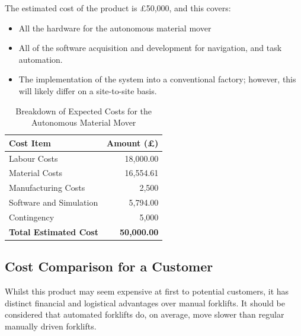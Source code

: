 \documentclass[12pt,titlepage]{article}
\begin{document}
\begin{table}[H]
    \centering
    \begin{minipage}[t]{0.5\textwidth}
        \setlength{\parskip}{0pt} %
        \vspace{-10pt}
        The estimated cost of the product is £50,000, and this covers:
        \vspace{-10pt}
        \begin{itemize}
        \setlength{\itemsep}{0pt}
            \item All the hardware for the autonomous material mover
            \item All of the software acquisition and development for navigation, and task automation.
            \item The implementation of the system into a conventional factory; however, this will likely differ on a site-to-site basis.
        \end{itemize}
    \end{minipage}%
    \hfill
    \begin{minipage}[t]{0.45\textwidth}
        \centering
        \vspace{-10pt}
        \begin{tabular}{|l|r|}
            \hline
            \textbf{Cost Item}          & \textbf{Amount (£)} \\ \hline
            Labour Costs                 & 18,000.00           \\ \hline
            Material Costs              & 16,554.61           \\ \hline
            Manufacturing Costs         & 2,500               \\ \hline
            Software and Simulation     & 5,794.00            \\ \hline
            Contingency                 & 5,000            \\ \hline
            \textbf{Total Estimated Cost} & \textbf{50,000.00}  \\ \hline
        \end{tabular}
        \vspace{-5pt} 
        \caption{Breakdown of Expected Costs for the Autonomous Material Mover}
        \label{tab:expected_costs}
    \end{minipage}
\end{table}


\subsection{Cost Comparison for a Customer}
Whilst this product may seem expensive at first to potential customers, it has distinct financial and logistical advantages over manual forklifts. It should be considered that automated forklifts do, on average, move slower than regular manually driven forklifts.
\end{document}
